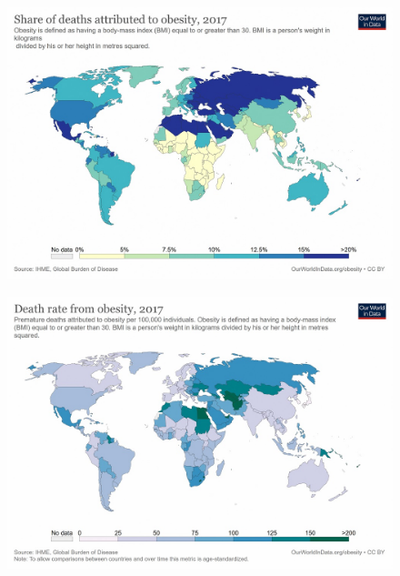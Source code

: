 \documentclass{beamer}
\begin{document}
\begin{frame}

\begin{figure}
	\centering
	\includegraphics[width=120mm]{obese3.jpg}
\end{figure}

\end{frame}

\begin{frame}

\begin{figure}
	\centering
	\includegraphics[width=120mm]{obese4.jpg}
\end{figure}

\end{frame}
\end{document}
